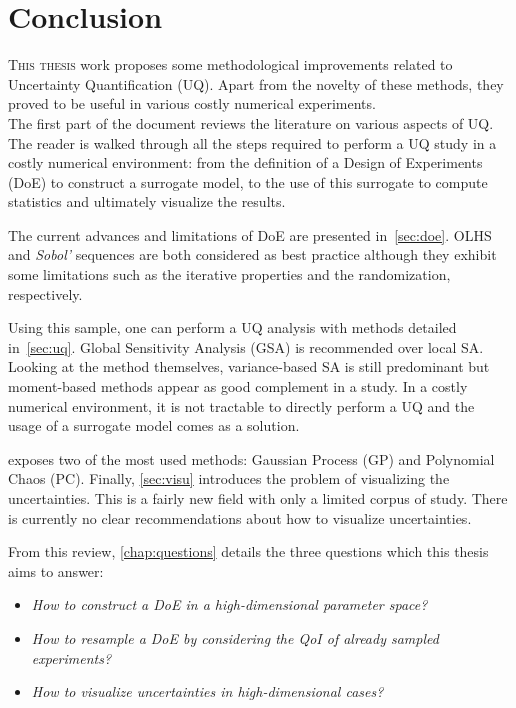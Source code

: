 \chapter*{Conclusion}

\lettrine{T}{his thesis} work proposes some methodological improvements related to Uncertainty Quantification (UQ). Apart from the novelty of these methods, they proved to be useful in various costly numerical experiments.\\

The first part of the document reviews the literature on various aspects of UQ. The reader is walked through all the steps required to perform a UQ study in a costly numerical environment: from the definition of a Design of Experiments (DoE) to construct a surrogate model, to the use of this surrogate to compute statistics and ultimately visualize the results.

The current advances and limitations of DoE are presented in~\cref{sec:doe}. OLHS and \emph{Sobol'} sequences are both considered as best practice although they exhibit some limitations such as the iterative properties and the randomization, respectively.

Using this sample, one can perform a UQ analysis with methods detailed in~\cref{sec:uq}. Global Sensitivity Analysis (GSA) is recommended over local SA. Looking at the method themselves, variance-based SA is still predominant but moment-based methods appear as good complement in a study. In a costly numerical environment, it is not tractable to directly perform a UQ and the usage of a surrogate model comes as a solution.

 exposes two of the most used methods: Gaussian Process (GP) and Polynomial Chaos (PC). Finally, \cref{sec:visu} introduces the problem of visualizing the uncertainties. This is a fairly new field with only a limited corpus of study. There is currently no clear recommendations about how to visualize uncertainties.

From this review, \cref{chap:questions} details the three questions which this thesis aims to answer:
\begin{itemize}
\item \emph{How to construct a DoE in a high-dimensional parameter space?}
\item \emph{How to resample a DoE by considering the QoI of already sampled experiments?}
\item \emph{How to visualize uncertainties in high-dimensional cases?}
\end{itemize}

